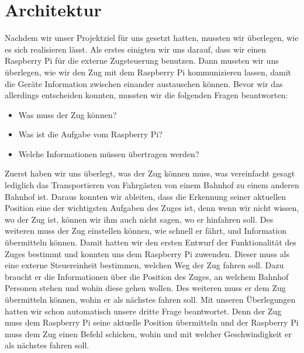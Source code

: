 \chapter{Architektur}
Nachdem wir unser Projektziel für uns gesetzt hatten, mussten wir überlegen, wie es sich realisieren lässt. Als erstes einigten wir uns darauf, dass wir einen Raspberry Pi für die externe Zugsteuerung benutzen. Dann mussten wir uns überlegen, wie wir den Zug mit dem Raspberry Pi kommunizieren lassen, damit die Geräte Information zwischen einander austauschen können. Bevor wir das allerdings entscheiden konnten, mussten wir die folgenden Fragen beantworten:
\begin{itemize}
\item Was muss der Zug können?
\item Was ist die Aufgabe vom Raspberry Pi?
\item Welche Informationen müssen übertragen werden? 
\end{itemize}
Zuerst haben wir uns überlegt, was der Zug können muss, was vereinfacht gesagt lediglich das Transportieren von Fahrgästen von einem Bahnhof zu einem anderen Bahnhof ist. Daraus konnten wir ableiten, dass die Erkennung seiner aktuellen Position eine der wichtigsten Aufgaben des Zuges ist, denn wenn wir nicht wissen, wo der Zug ist, können wir ihm auch nicht sagen, wo er hinfahren soll. Des weiteren muss der Zug einstellen können, wie schnell er fährt, und Information übermitteln können. Damit hatten wir den ersten Entwurf der Funktionalität des Zuges bestimmt und konnten uns dem Raspberry Pi zuwenden. Dieser muss als eine externe Steuereinheit bestimmen, welchen Weg der Zug fahren soll. Dazu braucht er die Informationen über die Position des Zuges, an welchem Bahnhof Personen stehen und wohin diese gehen wollen. Des weiteren muss er dem Zug übermitteln können, wohin er als nächstes fahren soll. Mit unseren Überlegungen hatten wir schon automatisch unsere dritte Frage beantwortet. Denn der Zug muss dem Raspberry Pi seine aktuelle Position übermitteln und der Raspberry Pi muss dem Zug einen Befehl schicken, wohin und mit welcher Geschwindigkeit er als nächstes fahren soll. 

